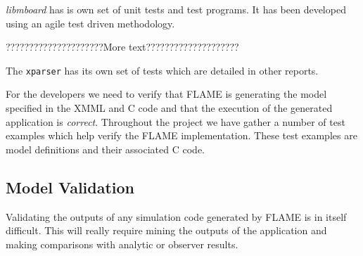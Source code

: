 \textit{libmboard} has is own set of unit tests and test programs. It has been developed using an agile test driven methodology.

?????????????????????More text????????????????????


The \texttt{xparser} has its own set of tests which are detailed in other reports.


For the developers we need to verify that FLAME is generating the model specified in the XMML and C code and that the execution of the generated application is \textit{correct}. Throughout the project we have gather a number of test examples which help verify the FLAME implementation. These test examples are model definitions and their associated C code. 


\subsection{Model Validation}

Validating the outputs of any simulation code generated by FLAME is in itself difficult. This will really require mining the outputs of the application and making comparisons with analytic or observer results.


